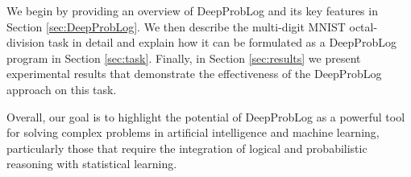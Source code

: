 We begin by providing an overview of DeepProbLog and its key features in Section \ref{sec:DeepProbLog}. We then describe the multi-digit MNIST octal-division task in detail and explain how it can be formulated as a DeepProbLog program in Section \ref{sec:task}. Finally, in Section \ref{sec:results} we present experimental results that demonstrate the effectiveness of the DeepProbLog approach on this task.


Overall, our goal is to highlight the potential of DeepProbLog as a powerful tool for solving complex problems in artificial intelligence and machine learning, particularly those that require the integration of logical and probabilistic reasoning with statistical learning.
